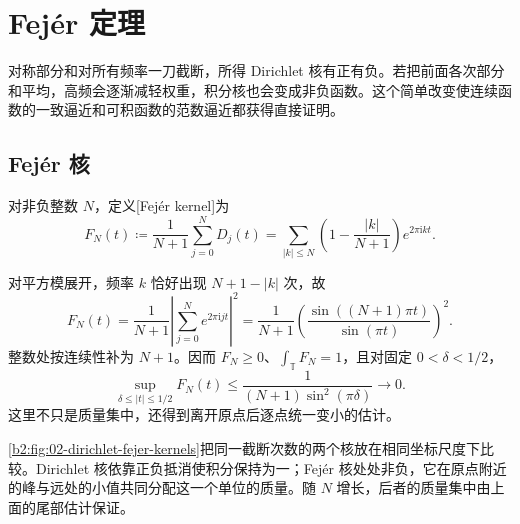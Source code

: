 \section{Fejér 定理}
\label{b2:sec:0204}

对称部分和对所有频率一刀截断，所得 Dirichlet 核有正有负。若把前面各次部分和平均，高频会逐渐减轻权重，积分核也会变成非负函数。这个简单改变使连续函数的一致逼近和可积函数的范数逼近都获得直接证明。

\subsection{Fejér 核}
\label{b2:subsec:020401}

\begin{definition}\label{b2:def:02-fejer-kernel}
对非负整数 \(N\)，定义[Fejér kernel]为
\[
 F_N(t)\coloneqq\dfrac1{N+1}\sum_{j=0}^N D_j(t)
 =\sum_{|k|\leq N}\left(1-\dfrac{|k|}{N+1}\right)e^{2\pi\mathrm{i}kt}.
\]
\end{definition}

对平方模展开，频率 \(k\) 恰好出现 \(N+1-|k|\) 次，故
\[
 F_N(t)=\dfrac1{N+1}\left|\sum_{j=0}^N e^{2\pi\mathrm{i}jt}\right|^2
 =\dfrac1{N+1}\left(\dfrac{\sin((N+1)\pi t)}{\sin(\pi t)}\right)^2.
\]
整数处按连续性补为 \(N+1\)。因而 \(F_N\geq0\)、\(\int_{\mathbb T}F_N=1\)，且对固定 \(0<\delta<1/2\)，
\[
 \sup_{\delta\leq|t|\leq1/2}F_N(t)
 \leq\dfrac1{(N+1)\sin^2(\pi\delta)}\longrightarrow0.
\]
这里不只是质量集中，还得到离开原点后逐点统一变小的估计。

\ProseParagraphBreak

\cref{b2:fig:02-dirichlet-fejer-kernels}把同一截断次数的两个核放在相同坐标尺度下比较。Dirichlet 核依靠正负抵消使积分保持为一；Fejér 核处处非负，它在原点附近的峰与远处的小值共同分配这一个单位的质量。随 \(N\) 增长，后者的质量集中由上面的尾部估计保证。

